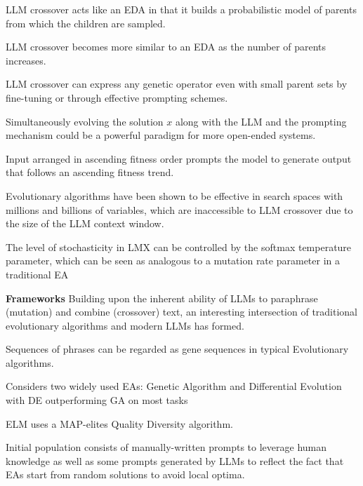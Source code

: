 LLM crossover acts like an EDA in that it builds a probabilistic model of parents from which the children are sampled. \cite{meyerson2024languagemodelcrossovervariation}

LLM crossover becomes more similar to an EDA as the number of parents increases. \cite{meyerson2024languagemodelcrossovervariation}

LLM crossover can express any genetic operator even with small parent sets by fine-tuning or through effective prompting schemes. \cite{meyerson2024languagemodelcrossovervariation}

Simultaneously evolving the solution $\mathit{x}$ along with the LLM and the prompting mechanism could be a powerful paradigm for more open-ended systems. \cite{meyerson2024languagemodelcrossovervariation}

Input arranged in ascending fitness order prompts the model to generate output that follows an ascending fitness trend. \cite{meyerson2024languagemodelcrossovervariation}

Evolutionary algorithms have been shown to be effective in search spaces with millions and billions of variables, which are inaccessible to LLM crossover due to the size of the LLM context window. \cite{meyerson2024languagemodelcrossovervariation}

The level of stochasticity in LMX can be controlled by the softmax temperature parameter, which can be seen as analogous to a mutation rate parameter in a traditional EA \cite{meyerson2024languagemodelcrossovervariation}


\textbf{Frameworks}
Building upon the inherent ability of LLMs to paraphrase (mutation) and combine (crossover) text, an interesting intersection of traditional evolutionary algorithms and modern LLMs has formed. 


Sequences of phrases can be regarded as gene sequences in typical Evolutionary algorithms. \cite{guo2024connectinglargelanguagemodels}


Considers two widely used EAs: Genetic Algorithm and Differential Evolution with DE outperforming GA on most tasks \cite{guo2024connectinglargelanguagemodels}

ELM uses a MAP-elites Quality Diversity algorithm. \cite{lehman2022evolutionlargemodels}

Initial population consists of manually-written prompts to leverage human knowledge as well as some prompts generated by LLMs to reflect the fact that EAs start from random solutions to avoid local optima. \cite{guo2024connectinglargelanguagemodels}


